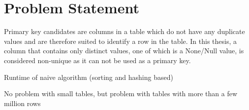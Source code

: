 \chapter{Problem Statement}\label{chap:problem_statement} %
Primary key candidates are columns in a table which do not have any duplicate values and are therefore suited to identify a row in the table. In this thesis, a column that contains only distinct values, one of which is a None/Null value, is considered non-unique as it can not be used as a primary key.  %

Runtime of naive algorithm (sorting and hashing based)

No problem with small tables, but problem with tables with more than a few million rows